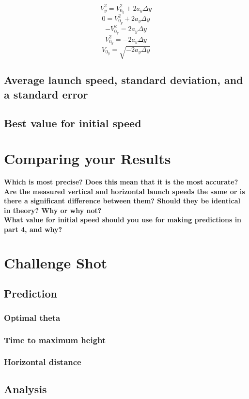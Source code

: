 \documentclass[11pt, letterpaper, includehead]{article}
\begin{document}
$$V_y^2 = V_{0_y}^2 + 2a_y\Delta y$$
$$0 = V_{0_y}^2 + 2a_y\Delta y$$
$$-V_{0_y}^2 = 2a_y\Delta y$$
$$V_{0_y}^2 = -2a_y\Delta y$$
$$V_{0_y} = \sqrt{-2a_y\Delta y}$$
\subsection{Average launch speed, standard deviation, and a standard error} %
\subsection{Best value for initial speed} %

\section{Comparing your Results} %
\textbf{Which is most precise? Does this mean that it is the most accurate?}\\ 

\textbf{Are the measured vertical and horizontal launch speeds the same or is there a
significant difference between them? Should they be identical in theory? Why or
why not?}\\

\textbf{What value for initial speed should you use for making predictions in part 4, and
why?}

\section{Challenge Shot} %
\subsection{Prediction} %
\subsubsection{Optimal theta} %
\subsubsection{Time to maximum height} %
\subsubsection{Horizontal distance} %
\subsection{Analysis}  %
\end{document}
